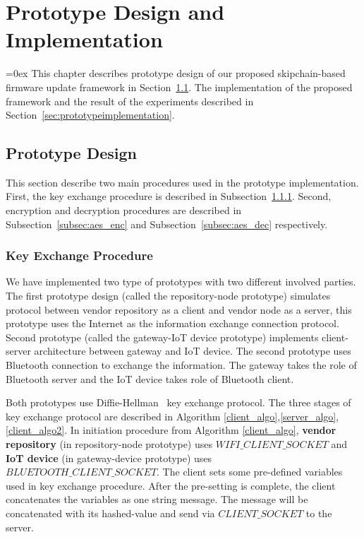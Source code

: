 \chapter{Prototype Design and Implementation}
\label{cha:4_prototypeImplementation}
\parskip=0ex
This chapter describes prototype design of our proposed skipchain-based firmware update framework in Section~\ref{sec:prototypedesign}. The implementation of the proposed framework and the result of the experiments described in Section~\ref{sec:prototypeimplementation}. 

\section{Prototype Design}
\label{sec:prototypedesign}

This section describe two main procedures used in the prototype implementation. First, the key exchange procedure is described in Subsection~\ref{subsec:keyexchange}. Second, encryption and decryption procedures are described in Subsection~\ref{subsec:aes_enc} and Subsection~\ref{subsec:aes_dec} respectively.

\subsection{Key Exchange Procedure}
\label{subsec:keyexchange}

We have implemented two type of prototypes with two different involved parties. The first prototype design (called the repository-node prototype) simulates protocol between vendor repository as a client and vendor node as a server, this prototype uses the Internet as the information exchange connection protocol. Second prototype (called the gateway-IoT device prototype) implements client-server architecture between gateway and IoT device. The second prototype uses Bluetooth connection to exchange the information. The gateway takes the role of Bluetooth server and the IoT device takes role of Bluetooth client.

\sloppy Both prototypes use Diffie-Hellman~\cite{Diffie:2006:NDC:2263321.2269104} key exchange protocol. The three stages of key exchange protocol are described in Algorithm \ref{client_algo},\ref{server_algo},\ref{client_algo2}. In initiation procedure from Algorithm \ref{client_algo}, \textbf{vendor repository} (in repository-node prototype) uses $WIFI\_CLIENT\_SOCKET$ and \textbf{IoT device} (in gateway-device prototype) uses $BLUETOOTH\_CLIENT\_SOCKET$. The client sets some pre-defined variables used in key exchange procedure. After the pre-setting is complete, the client concatenates the variables as one string message. The message will be concatenated with its hashed-value and send via $CLIENT\_SOCKET$ to the server.

